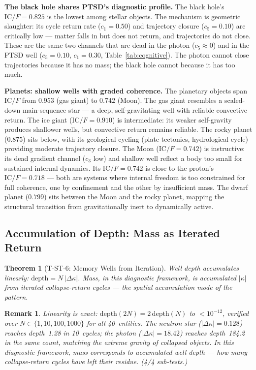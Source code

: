 \documentclass[
  aps,
  prd,
  twocolumn,
  superscriptaddress,
  nofootinbib,
  floatfix
]{revtex4-2}
\newtheorem{theorem}{Theorem}
\newtheorem{remark}{Remark}
\newcommand{\IC}{\mathrm{IC}}
\begin{document}
\textbf{The black hole shares PTSD's diagnostic profile.}
The black hole's $\IC/F = 0.825$ is the lowest among stellar
objects.  The mechanism is geometric slaughter: its cycle
return rate ($c_1 = 0.50$) and trajectory closure
($c_5 = 0.10$) are critically low --- matter falls in but
does not return, and trajectories do not close.  These are
the same two channels that are dead in the photon ($c_5
\approx 0$) and in the PTSD well ($c_5 = 0.10$,
$c_1 = 0.30$, Table~\ref{tab:cognitive}).  The photon cannot close trajectories because
it has no mass; the black hole cannot because it has too much.

\textbf{Planets: shallow wells with graded coherence.}
The planetary objects span $\IC/F$ from $0.953$ (gas giant)
to $0.742$ (Moon).  The gas giant resembles a scaled-down
main-sequence star --- a deep, self-gravitating well with
reliable convective return.  The ice giant ($\IC/F = 0.910$)
is intermediate: its weaker self-gravity produces shallower
wells, but convective return remains reliable.
The rocky planet ($0.875$)
sits below, with its geological cycling (plate tectonics,
hydrological cycle) providing moderate trajectory closure.
The Moon ($\IC/F = 0.742$) is instructive: its dead
gradient channel ($c_3$ low) and shallow well reflect a
body too small for sustained internal dynamics.  Its
$\IC/F = 0.742$ is close to the proton's
$\IC/F = 0.718$ --- both are systems where internal freedom
is too constrained for full coherence, one by confinement
and the other by insufficient mass.  The dwarf planet
($0.799$) sits between the Moon and the rocky planet,
mapping the structural transition from gravitationally
inert to dynamically active.

\subsection{Accumulation of Depth: Mass as Iterated Return}

\begin{theorem}[T-ST-6: Memory Wells from Iteration]
\label{thm:T6}
Well depth accumulates linearly:
$\mathrm{depth} = N\,|\Delta\kappa|$.
Mass, in this diagnostic framework, is accumulated $|\kappa|$
from iterated collapse-return cycles --- the spatial
accumulation mode of the pattern.
\end{theorem}

\begin{remark}
Linearity is exact: $\mathrm{depth}(2N) = 2\,\mathrm{depth}(N)$
to $< 10^{-12}$, verified over $N \in \{1, 10, 100, 1000\}$
for all 40~entities.  The neutron star ($|\Delta\kappa| = 0.128$)
reaches depth~1.28 in 10~cycles; the photon ($|\Delta\kappa| =
18.42$) reaches depth~184.2 in the same count, matching the
extreme gravity of collapsed objects.  In this diagnostic
framework, mass corresponds to accumulated well depth ---
how many collapse-return cycles have left their
residue.  (4/4 sub-tests.)
\end{remark}
\end{document}
